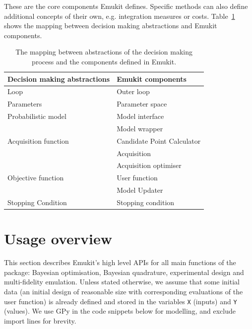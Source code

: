 These are the core components Emukit defines. Specific methods can also define additional concepts of their own, e.g. integration measures or costs. Table~\ref{table:abstraction_mapping} shows the mapping between decision making abstractions and Emukit components.

\begin{table}
    \setlength{\DUtablewidth}{\tablewidth}
    \begin{longtable}[c]{p{0.4\DUtablewidth}p{0.4\DUtablewidth}}
        \toprule
        \textbf{Decision making abstractions} & \textbf{Emukit components} \\
        \midrule
        \endfirsthead
        Loop & Outer loop \\
        \midrule
        Parameters & Parameter space \\
        Probabilistic model & Model interface \\
        & Model wrapper \\
        \midrule
        Acquisition function & Candidate Point Calculator \\
        & Acquisition \\
        & Acquisition optimiser \\
        \midrule
        Objective function & User function \\
        & Model Updater \\
        \midrule
        Stopping Condition & Stopping condition \\
        \bottomrule
    \end{longtable}
    \caption{The mapping between abstractions of the decision making process and the components defined in Emukit.}
    \label{table:abstraction_mapping}
\end{table}

\section{Usage overview}\label{sec:usage}
This section describes Emukit's high level APIs for all main functions of the package: Bayesian optimisation, Bayesian quadrature, experimental design and multi-fidelity emulation. Unless stated otherwise, we assume that some initial data (an initial design of reasonable size with corresponding evaluations of the user function) is already defined and stored in the variables \texttt{X} (inputs) and \texttt{Y} (values). We use GPy \cite{gpy2014} in the code snippets below for modelling, and exclude import lines for brevity.

